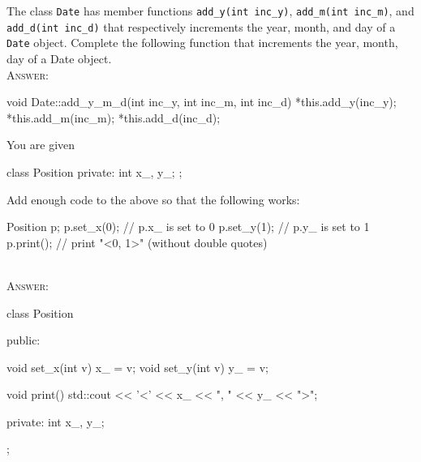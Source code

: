 

\renewcommand\AUTHOR{cadalebout1@cougars.ccis.edu} %


\topmattertwo

\nextq
The class \verb!Date! has member functions
\verb!add_y(int inc_y)!,
\verb!add_m(int inc_m)!, and 
\verb!add_d(int inc_d)! that respectively increments the
year, month, and day of a \verb!Date! object.
Complete the following function that
increments the year, month, day of a Date object.
\\
\textsc{Answer:}\vspace{-2mm}
\begin{answercode}
void Date::add_y_m_d(int inc_y, int inc_m, int inc_d)
{
        *this.add_y(inc_y);
        *this.add_m(inc_m);
        *this.add_d(inc_d);
}
\end{answercode}

\nextq
You are given
\begin{console}[fontsize=\footnotesize,frame=single]
class Position
{
private:
    int x_, y_;
};
\end{console}
Add enough code to the above so that the following works:
\begin{console}[fontsize=\footnotesize,frame=single]
Position p;
p.set_x(0); // p.x_ is set to 0
p.set_y(1); // p.y_ is set to 1
p.print();  // print "<0, 1>" (without double quotes)
\end{console}
\\
\textsc{Answer:}\vspace{-2mm}
\begin{answercode}
class Position
{
public:

void set_x(int v){ x_ = v; }
void set_y(int v){ y_ = v; }

void print()
{
        std::cout << '<' << x_ << ", " << y_ << ">\n";
}

private:
    int x_, y_;
};
\end{answercode}

